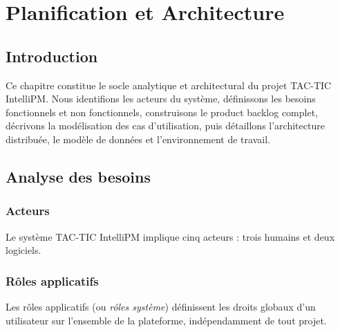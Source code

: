 \chapter{Planification et Architecture}

\section{Introduction}

Ce chapitre constitue le socle analytique et architectural du projet
TAC-TIC IntelliPM. Nous identifions les acteurs du système, définissons les besoins
fonctionnels et non fonctionnels, construisons le product backlog complet,
décrivons la modélisation des cas d'utilisation, puis détaillons l'architecture
distribuée, le modèle de données et l'environnement de travail.

\section{Analyse des besoins}

\subsection{Acteurs}

Le système TAC-TIC IntelliPM implique cinq acteurs : trois humains et deux
logiciels.

\subsection{Rôles applicatifs}

Les rôles applicatifs (ou \textit{rôles système}) définissent les droits globaux
d'un utilisateur sur l'ensemble de la plateforme, indépendamment de tout projet.

